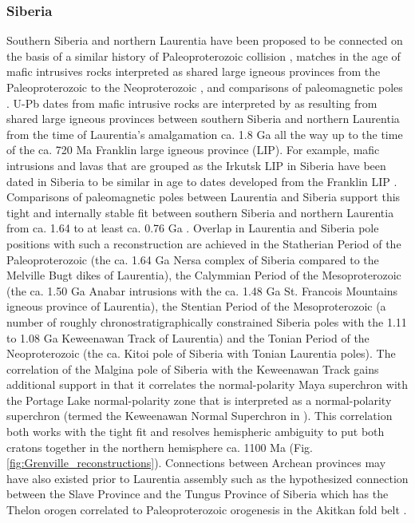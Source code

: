 \documentclass[twocolumn, switch]{article} %
\begin{document}
\subsubsection{Siberia}

Southern Siberia and northern Laurentia have been proposed to be connected on the basis of a similar history of Paleoproterozoic collision \citep{Rainbird1998a}, matches in the age of mafic intrusives rocks interpreted as shared large igneous provinces from the Paleoproterozoic to the Neoproterozoic \cite{Ernst2016a}, and comparisons of paleomagnetic poles \citep{Evans2011a, Evans2016b}. U-Pb dates from mafic intrusive rocks are interpreted by \cite{Ernst2016a} as resulting from shared large igneous provinces between southern Siberia and northern Laurentia from the time of Laurentia's amalgamation ca. 1.8 Ga all the way up to the time of the ca. 720 Ma Franklin large igneous province (LIP). For example, mafic intrusions and lavas that are grouped as the Irkutsk LIP in Siberia have been dated in Siberia to be similar in age to dates developed from the Franklin LIP \citep{Denyszyn2009a, Ernst2016a}. Comparisons of paleomagnetic poles between Laurentia and Siberia support this tight and internally stable fit between southern Siberia and northern Laurentia from ca. 1.64 to at least ca. 0.76 Ga  \citep{Evans2016b}. Overlap in Laurentia and Siberia pole positions with such a reconstruction are achieved in the Statherian Period of the Paleoproterozoic (the ca. 1.64 Ga Nersa complex of Siberia compared to the Melville Bugt dikes of Laurentia), the Calymmian Period of the Mesoproterozoic (the ca. 1.50 Ga Anabar intrusions with the ca. 1.48 Ga St. Francois Mountains igneous province of Laurentia), the Stentian Period of the Mesoproterozoic (a number of roughly chronostratigraphically constrained Siberia poles with the 1.11 to 1.08 Ga Keweenawan Track of Laurentia) and the Tonian Period of the Neoproterozoic (the ca.  Kitoi pole of Siberia with Tonian Laurentia poles).  The correlation of the Malgina pole of Siberia with the Keweenawan Track gains additional support in that it correlates the normal-polarity Maya superchron \citep{Gallet2012a} with the Portage Lake normal-polarity zone \citep{Swanson-Hysell2019a} that is interpreted as a normal-polarity superchron (termed the Keweenawan Normal Superchron in \citealp{Driscoll2016a}). This correlation both works with the tight fit and resolves hemispheric ambiguity to put both cratons together in the northern hemisphere ca. 1100 Ma (Fig. \ref{fig:Grenville_reconstructions}). Connections between Archean provinces may have also existed prior to Laurentia assembly such as the hypothesized connection between the Slave Province and the Tungus Province of Siberia which has the Thelon orogen correlated to Paleoproterozoic orogenesis in the Akitkan fold belt \citep{Condie1994a, Rainbird1998a, Evans2011a}.
\end{document}
